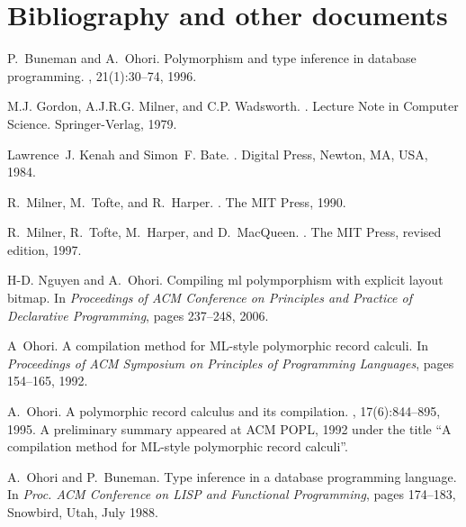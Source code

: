 \documentclass{jbook}
\newcommand{\txt}[2]{#2}
\begin{document}
\part{\txt{参考文献，その他}{Bibliography and other documents}}
\label{part:bib}
% 
% 
\begin{thebibliography}{10}

P.~Buneman and A.~Ohori.
\newblock Polymorphism and type inference in database programming.
, 21(1):30--74, 1996.

M.J. Gordon, A.J.R.G. Milner, and C.P. Wadsworth.
.
\newblock Lecture Note in Computer Science. Springer-Verlag, 1979.

Lawrence~J. Kenah and Simon~F. Bate.
.
\newblock Digital Press, Newton, MA, USA, 1984.

R.~Milner, M.~Tofte, and R.~Harper.
.
\newblock The MIT Press, 1990.

R.~Milner, R.~Tofte, M.~Harper, and D.~MacQueen.
.
\newblock The MIT Press, revised edition, 1997.

H-D. Nguyen and A.~Ohori.
\newblock Compiling ml polymporphism with explicit layout bitmap.
\newblock In {\em Proceedings of ACM Conference on Principles and Practice of
  Declarative Programming}, pages 237--248, 2006.

A~Ohori.
\newblock A compilation method for {ML}-style polymorphic record calculi.
\newblock In {\em Proceedings of ACM Symposium on Principles of Programming
  Languages}, pages 154--165, 1992.

A.~Ohori.
\newblock A polymorphic record calculus and its compilation.
,
  17(6):844--895, 1995.
\newblock A preliminary summary appeared at ACM POPL, 1992 under the title ``A
  compilation method for ML-style polymorphic record calculi''.

A.~Ohori and P.~Buneman.
\newblock Type inference in a database programming language.
\newblock In {\em Proc. ACM Conference on LISP and Functional Programming},
  pages 174--183, Snowbird, Utah, July 1988.


\end{thebibliography}
\end{document}
